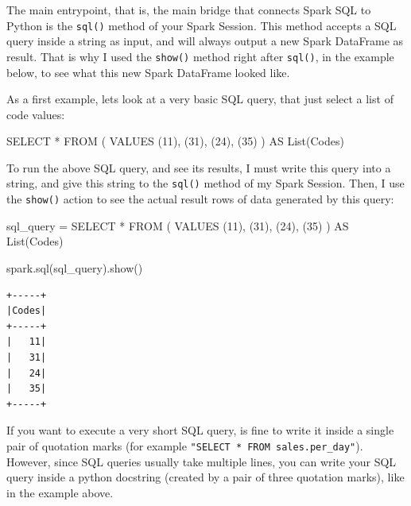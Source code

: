 \documentclass[
  11pt,
  letterpaper,
  DIV=11,
  numbers=noendperiod]{scrreprt}
\newenvironment{Shaded}{\begin{snugshade}}{\end{snugshade}}
\newcommand{\DecValTok}[1]{\textcolor[rgb]{0.68,0.00,0.00}{#1}}
\newcommand{\KeywordTok}[1]{\textcolor[rgb]{0.00,0.23,0.31}{#1}}
\newcommand{\NormalTok}[1]{\textcolor[rgb]{0.00,0.23,0.31}{#1}}
\newcommand{\OperatorTok}[1]{\textcolor[rgb]{0.37,0.37,0.37}{#1}}
\newcommand{\StringTok}[1]{\textcolor[rgb]{0.13,0.47,0.30}{#1}}
\begin{document}
The main entrypoint, that is, the main bridge that connects Spark SQL to
Python is the \texttt{sql()} method of your Spark Session. This method
accepts a SQL query inside a string as input, and will always output a
new Spark DataFrame as result. That is why I used the \texttt{show()}
method right after \texttt{sql()}, in the example below, to see what
this new Spark DataFrame looked like.

As a first example, lets look at a very basic SQL query, that just
select a list of code values:

\begin{Shaded}
\begin{Highlighting}[]
\KeywordTok{SELECT} \OperatorTok{*}
\KeywordTok{FROM}\NormalTok{ (}
  \KeywordTok{VALUES}\NormalTok{ (}\DecValTok{11}\NormalTok{), (}\DecValTok{31}\NormalTok{), (}\DecValTok{24}\NormalTok{), (}\DecValTok{35}\NormalTok{)}
\NormalTok{) }\KeywordTok{AS} \KeywordTok{List}\NormalTok{(Codes)}
\end{Highlighting}
\end{Shaded}

To run the above SQL query, and see its results, I must write this query
into a string, and give this string to the \texttt{sql()} method of my
Spark Session. Then, I use the \texttt{show()} action to see the actual
result rows of data generated by this query:

\begin{Shaded}
\begin{Highlighting}[]
\NormalTok{sql\_query }\OperatorTok{=} \StringTok{\textquotesingle{}\textquotesingle{}\textquotesingle{}}
\StringTok{SELECT *}
\StringTok{FROM (}
\StringTok{  VALUES (11), (31), (24), (35)}
\StringTok{) AS List(Codes)}
\StringTok{\textquotesingle{}\textquotesingle{}\textquotesingle{}}

\NormalTok{spark.sql(sql\_query).show()}
\end{Highlighting}
\end{Shaded}

\begin{verbatim}
+-----+
|Codes|
+-----+
|   11|
|   31|
|   24|
|   35|
+-----+
\end{verbatim}

If you want to execute a very short SQL query, is fine to write it
inside a single pair of quotation marks (for example
\texttt{"SELECT\ *\ FROM\ sales.per\_day"}). However, since SQL queries
usually take multiple lines, you can write your SQL query inside a
python docstring (created by a pair of three quotation marks), like in
the example above.
\end{document}
